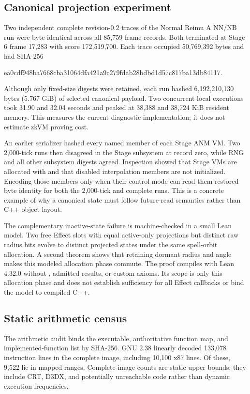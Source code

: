 \subsection{Canonical projection experiment}

Two independent complete revision-0.2 traces of the Normal Reimu A NN/NB run
were byte-identical across all 85,759 frame records.  Both terminated at Stage
6 frame 17,283 with score 172,519,700.  Each trace occupied 50,769,392 bytes and
had SHA-256
\begin{center}
\small\ttfamily
ea0cdf948ba7668cba31064dfa421a9c279fdab28bdbd1d57c817ba13db84117.
\end{center}
Although only fixed-size digests were retained, each run hashed
6,192,210,130 bytes (5.767 GiB) of selected canonical payload.  Two concurrent
local executions took 31.90 and 32.04 seconds and peaked at 38,388 and 38,724
KiB resident memory.  This measures the current diagnostic implementation; it
does not estimate zkVM proving cost.

An earlier serializer hashed every named member of each Stage ANM VM.  Two
2,000-tick runs then disagreed in the Stage subsystem at record zero, while RNG
and all other subsystem digests agreed.  Inspection showed that Stage VMs are
allocated with  and that disabled interpolation members are not
initialized.  Encoding those members only when their control mode can read
them restored byte identity for both the 2,000-tick and complete runs.  This is
a concrete example of why a canonical state must follow future-read semantics
rather than C++ object layout.

The complementary inactive-state failure is machine-checked in a small Lean
model.  Two free Effect slots with equal active-only projections but distinct
raw radius bits evolve to distinct projected states under the same spell-orbit
allocation.  A second theorem shows that retaining dormant radius and angle
makes this modeled allocation phase commute.  The proof compiles with Lean
4.32.0 without , admitted results, or custom axioms.  Its scope is
only this allocation phase and does not establish sufficiency for all Effect
callbacks or bind the model to compiled C++.

\subsection{Static arithmetic census}

The arithmetic audit binds the executable, authoritative function map, and
implemented-function list by SHA-256.  GNU  2.38 linearly decoded
133,078 instruction lines in the complete image, including 10,100 x87 lines.
Of these, 9,522 lie in mapped ranges.  Complete-image counts are static upper
bounds: they include CRT, D3DX, and potentially unreachable code rather than
dynamic execution frequencies.

